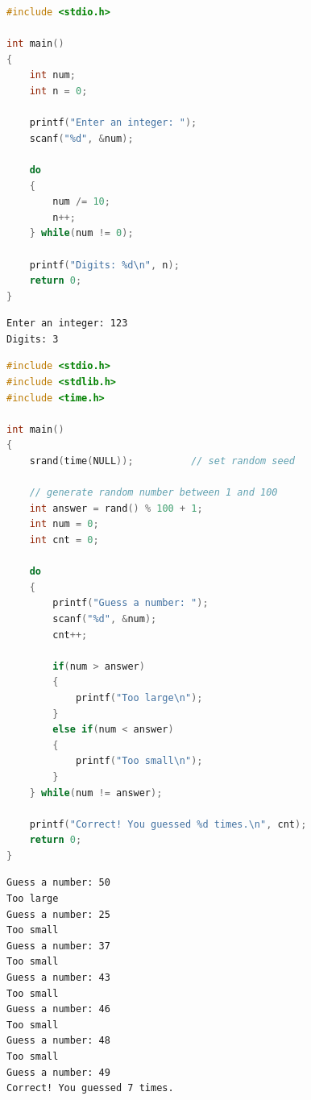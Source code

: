 
\begin{lstlisting}[language=C]
#include <stdio.h>

int main()
{
    int num;
    int n = 0;

    printf("Enter an integer: ");
    scanf("%d", &num);

    do
    {
        num /= 10;
        n++;
    } while(num != 0);

    printf("Digits: %d\n", n);
    return 0;
}
\end{lstlisting}

\begin{tcolorbox}
    \begin{verbatim}
Enter an integer: 123
Digits: 3
\end{verbatim}
\end{tcolorbox}

\vspace{0.5cm}


\begin{lstlisting}[language=C]
#include <stdio.h>
#include <stdlib.h>
#include <time.h>

int main()
{
    srand(time(NULL));          // set random seed

    // generate random number between 1 and 100
    int answer = rand() % 100 + 1;
    int num = 0;
    int cnt = 0;

    do
    {
        printf("Guess a number: ");
        scanf("%d", &num);
        cnt++;
        
        if(num > answer)
        {
            printf("Too large\n");
        }
        else if(num < answer)
        {
            printf("Too small\n");
        }
    } while(num != answer);
    
    printf("Correct! You guessed %d times.\n", cnt);
    return 0;
}
\end{lstlisting}

\begin{tcolorbox}
    \begin{verbatim}
Guess a number: 50
Too large
Guess a number: 25
Too small
Guess a number: 37
Too small
Guess a number: 43
Too small
Guess a number: 46
Too small
Guess a number: 48
Too small
Guess a number: 49
Correct! You guessed 7 times.
\end{verbatim}
\end{tcolorbox}

\newpage

